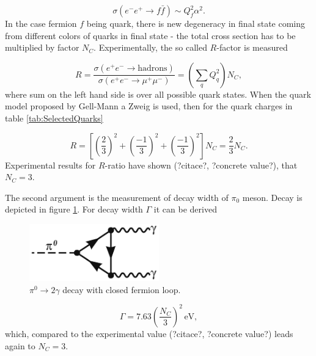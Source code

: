 \documentclass[a4paper,11pt]{report}
\begin{document}
\begin{equation}
  \sigma (e^- e^+ \rightarrow f \bar{f} ) \sim Q_f^2 \alpha^2.
  \label{eq:NumberOfColorsBasicCrossSection}
\end{equation}
In the case fermion $f$ being quark, there is new degeneracy in final state
coming from different colors of quarks in final state - the total cross section
has to be multiplied by factor $N_C$. Experimentally, the so called $R$-factor
is measured

\begin{equation}
  R = \frac{\sigma(e^+ e^- \rightarrow \text{hadrons})}{\sigma(e^+ e^-
  \rightarrow \mu^+ \mu^-)} = \left( \sum_q Q_q^2 \right) N_C,
  \label{eq:NumberOfColorsRatio}
\end{equation}
where sum on the left hand side is over all possible quark states. When the
quark model proposed by Gell-Mann a Zweig is used, then for the quark charges in table
\ref{tab:SelectedQuarks}

\begin{equation}
  R = \left[ \left( \frac{2}{3} \right)^2 +
    \left( \frac{-1}{3} \right)^2 +
  \left( \frac{-1}{3} \right)^2 \right] N_C = \frac{2}{3}N_C.
  \label{eq:NumberOfColorsSubstitued}
\end{equation}
Experimental results for $R$-ratio have shown (?citace?, ?concrete value?), that
$N_C = 3$.

The second argument is the measurement of decay width of $\pi_0$ meson. Decay is
depicted in figure \ref{fig:PiDecay}. For decay width $\Gamma$ it can be derived 

\begin{figure}[t]
  \centering
  \includegraphics[width=0.5\textwidth]{Chapter1/PiMesonDecay.png} 
  \caption{$\pi^0 \rightarrow 2 \gamma$ decay with closed fermion loop.}
  \label{fig:PiDecay}
\end{figure}

\begin{equation}
  \Gamma = 7.63 \left( \frac{N_C}{3} \right)^2 \, \text{eV},
  \label{ex:PiMesonDecayWidth}
\end{equation}
which, compared to the experimental value (?citace?, ?concrete value?) leads
again to $N_C=3$.
\end{document}
